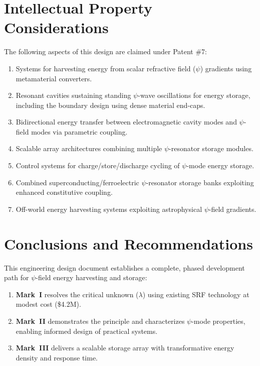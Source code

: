 \documentclass[11pt,a4paper]{article}
\begin{document}
\section{Intellectual Property Considerations}

The following aspects of this design are claimed under Patent \#7:

\begin{enumerate}
\item Systems for harvesting energy from scalar refractive field ($\psi$)
gradients using metamaterial converters.

\item Resonant cavities sustaining standing $\psi$-wave oscillations for
energy storage, including the boundary design using dense material
end-caps.

\item Bidirectional energy transfer between electromagnetic cavity modes
and $\psi$-field modes via parametric coupling.

\item Scalable array architectures combining multiple $\psi$-resonator
storage modules.

\item Control systems for charge/store/discharge cycling of $\psi$-mode
energy storage.

\item Combined superconducting/ferroelectric $\psi$-resonator storage
banks exploiting enhanced constitutive coupling.

\item Off-world energy harvesting systems exploiting astrophysical
$\psi$-field gradients.
\end{enumerate}

\section{Conclusions and Recommendations}

This engineering design document establishes a complete, phased development
path for $\psi$-field energy harvesting and storage:

\begin{enumerate}
\item \textbf{Mark~I} resolves the critical unknown ($\lambda$) using
existing SRF technology at modest cost (\$4.2M).

\item \textbf{Mark~II} demonstrates the principle and characterizes
$\psi$-mode properties, enabling informed design of practical systems.

\item \textbf{Mark~III} delivers a scalable storage array with
transformative energy density and response time.
\end{enumerate}
\end{document}
